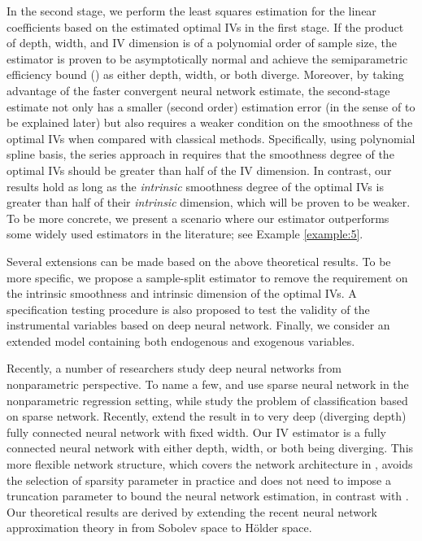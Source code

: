 \documentclass[11pt, preprint]{imsart}
\numberwithin{equation}{section}
\theoremstyle{plain}
\theoremstyle{definition}
\begin{document}
In the second stage, we perform the least squares estimation for the linear coefficients based on the estimated optimal IVs in the first stage. If the product of depth, width, and IV dimension is of a polynomial order of sample size, the estimator is proven to be asymptotically normal and achieve the semiparametric efficiency bound (\citealp{bickel1993efficient}) as either depth, width, or both diverge. Moreover, by taking advantage of the faster convergent neural network estimate, the second-stage estimate not only has {a smaller (second order) estimation error (in the sense of \cite{cheng2008general} to be explained later)} but also requires a weaker condition on the smoothness of the optimal IVs when compared with classical methods. Specifically, using polynomial spline basis, the series approach in \cite{bcch12} requires that the smoothness degree of the optimal IVs should be greater than half of the IV dimension. In contrast, our results hold as long as the {\em intrinsic} smoothness degree of the optimal IVs is greater than half of their {\em intrinsic} dimension, which will be proven to be weaker. {To be more concrete, we present a scenario where our estimator outperforms some widely used estimators in the literature; see Example \ref{example:5}.} 

Several extensions can be made based on the above theoretical results. To be more specific, we propose a sample-split estimator to remove the requirement on the intrinsic smoothness and intrinsic dimension of the optimal IVs. A specification testing procedure is also proposed to test the validity of the instrumental variables based on deep neural network. Finally, we consider an extended model containing both endogenous and exogenous variables.

{Recently, a number of researchers study deep neural networks from nonparametric perspective. To name a few, \cite{bk19} and \cite{s19} use sparse neural network in the nonparametric regression setting, while \cite{kim2018fast} study the problem of classification based on sparse network. Recently,  \cite{mk19} extend the result in \cite{bk19} to very deep (diverging depth) fully connected neural network with fixed width. Our IV estimator is a fully connected neural network with either depth, width, or both being diverging. This more flexible network structure, which covers the network architecture in \cite{mk19}, avoids the selection of sparsity parameter in practice and does not need to impose a truncation parameter to bound the neural network estimation, in contrast with \cite{bk19, s19, mk19}. Our theoretical results are derived by extending the recent neural network approximation theory in \cite{lsyz20} from Sobolev space to H\" older space.}
\end{document}

